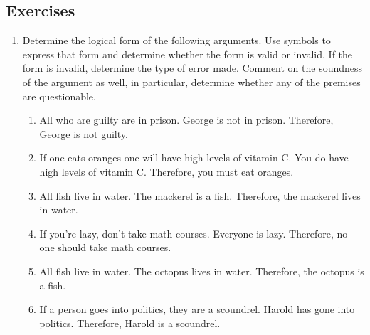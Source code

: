 \documentclass[10pt,]{book}
\theoremstyle{plain}
\theoremstyle{definition}
\theoremstyle{definition}
\numberwithin{equation}{section}
\newcommand{\hrulethin}  {\noalign{\hrule height 0.04em}}
\newcommand{\hint}[1]{ }
\begin{document}
\subsection[{Exercises}]{Exercises}\label{exercises-14}
\leavevmode%
\begin{enumerate}[label=(\alph*)]
\item\hypertarget{li-206}{}
    Determine the logical form of the following arguments.  Use symbols
    to express that form and determine whether the form is valid or invalid.
    If the form is invalid, determine the type of error made.  Comment on the 
    soundness of the argument as well, in particular, determine whether any of
    the premises are questionable.

\begin{enumerate}[label=\roman*.]
\item\hypertarget{li-207}{}
          All who are guilty are in prison. 
            George is not in prison.  
            Therefore, George is not guilty.
 
 
 
            \hint{ 
            This looks like modus tollens. Let \(G\) refer to ``guilt'' and \(P\) refer to ``in prison''
          \begin{tabular}{ll}
&\(\forall x, G(x) \implies P(x)\)\tabularnewline[0pt]
&\({\lnot}P(\mbox{George} )\)\tabularnewline[0pt]
&\tabularnewline\hrulethin
\(\therefore\)&\({\lnot}G(\mbox{George} )\)
\end{tabular}

          You should note that while the form is valid, there is something terribly wrong with this argument. Is it really true that everyone who is guilty of a crime is in prison?
          }
\item\hypertarget{li-208}{}
          If one eats oranges one will have high levels of vitamin C. 
            You do have high levels of vitamin C. 
            Therefore, you must eat oranges.
\item\hypertarget{li-209}{}
          All fish live in water. 
            The mackerel is a fish. 
            Therefore, the mackerel lives in water.
\item\hypertarget{li-210}{}
          If you're lazy, don't take math courses.
            Everyone is lazy. 
            Therefore, no one should take math courses.
\item\hypertarget{li-211}{}
          All fish live in water. 
            The octopus lives in water. 
            Therefore, the octopus is a fish.
\item\hypertarget{li-212}{}
          If a person goes into politics, they are a scoundrel.
            Harold has gone into politics. 
            Therefore, Harold is a scoundrel.
\end{enumerate}


\end{enumerate}
\end{document}
